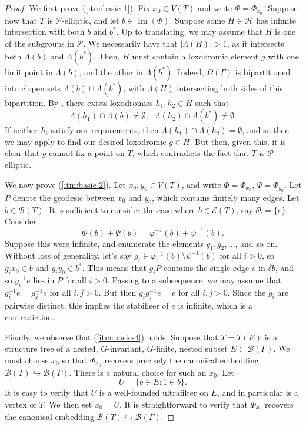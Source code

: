 \documentclass[11pt,a4paper]{amsart}
\newcommand{\into}{\hookrightarrow}
\theoremstyle{definition}
\newcommand{\per}{\mathcal{H}}
\newcommand{\br}{{\mathscr{B}}}
\begin{document}
\begin{proof}
    We first prove (\ref{itm:basic-1}). Fix $x_0 \in V(T)$ and write $\Phi = \Phi_{x_0}$. 
    Suppose now that $T$ is $\mathcal P$-elliptic, and let $b \in \operatorname{Im}(\Phi)$. Suppose some $H \in \per$ has infinite intersection with both $b$ and $b^\ast$. Up to translating, we may assume that $H$ is one of the subgroups in $\mathcal P$. We necessarily have that $|\Lambda(H)| > 1$, as it intersects both $\Lambda(b)$ and $\Lambda(b^\ast)$. Then, $H$ must contain a loxodromic element $g$ with one limit point in $\Lambda(b)$, and the other in $\Lambda(b^\ast)$. Indeed, $\Omega(\Gamma)$ is bipartitioned into clopen sets $\Lambda(b) \sqcup \Lambda(b^\ast)$, with $\Lambda(H)$ intersecting both sides of this bipartition. By \cite[Thm.~2.6(i)]{Hamann}, there exists loxodromics $h_1, h_2 \in H$ such that 
    $$
    \Lambda(h_1) \cap \Lambda(b) \neq \emptyset, \ \ \ \Lambda(h_2) \cap \Lambda(b^\ast) \neq \emptyset. 
    $$
    If neither $h_i$ satisfy our requirements, then $\Lambda(h_1) \cap \Lambda(h_2) = \emptyset$, and so then we may apply \cite[Thm.~2.8]{Hamann} to find our desired loxodromic $g \in H$.
    But then, given this, it is clear that $g$ cannot fix a point on $T$, which contradicts the fact that $T$ is $\mathcal P$-elliptic.

    We now prove (\ref{itm:basic-2}). Let $x_0,y_0 \in V(T)$, and write $\Phi = \Phi_{x_0}$, $\Psi = \Phi_{y_0}$. Let $P$ denote the geodesic between $x_0$ and $y_0$, which contains finitely many edges. Let $b \in \br(T)$. It is sufficient to consider the case where $b \in \mathscr E(T)$, say $\delta b = \{e\}$. Consider 
    $$
    \Phi(b) + \Psi(b) = \varphi^{-1}(b) + \psi^{-1}(b).
    $$
    Suppose this were infinite, and enumerate the elements $g_1, g_2, \ldots$, and so on. Without loss of generality, let's say $g_i \in \varphi^{-1}(b) \setminus \psi^{-1}(b)$ for all $i > 0$, so $g_ix_0 \in b$ and $g_iy_0\in b^\ast$. This means that $g_iP$ contains the single edge $e$ in $\delta b$, and so $g^{-1}_ie$ lies in $P$ for all $i > 0$. Passing to a subsequence, we may assume that $g^{-1}_ie = g^{-1}_je$ for all $i,j > 0$. But then $g_i g^{-1}_je = e$ for all $i, j >0$. Since the $g_i$ are pairwise distinct, this implies the stabiliser of $e$ is infinite, which is a contradiction.


    Finally, we observe that (\ref{itm:basic-4}) holds. Suppose that $T = T(E)$ is a structure tree of a nested, $G$-invariant, $G$-finite, nested subset $E \subset \br(\Gamma)$. We must choose $x_0$ so that $\Phi_{x_0}$ recovers precisely the canonical embedding $\br(T) \into \br(\Gamma)$. There is a natural choice for such an $x_0$. Let
    $$
    U = \{b \in E: 1 \in b\}.
    $$
    It is easy to verify that $U$ is a well-founded ultrafilter on $E$, and in particular is a vertex of $T$. We then set $x_0 = U$. It is straightforward to verify that $\Phi_{x_0}$ recovers the canonical embedding $\br(T) \into \br(\Gamma)$. 
\end{proof}    
\end{document}
